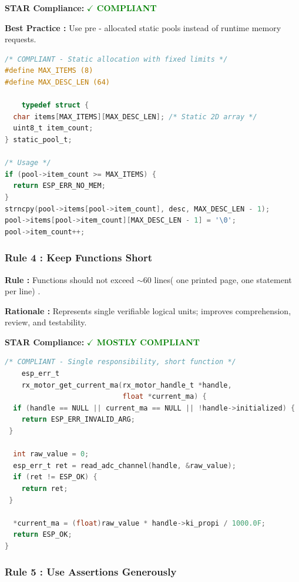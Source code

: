 \textbf{STAR Compliance:
}
\textcolor{green} {
  \textbf{$\checkmark$ COMPLIANT}
}

\textbf{Best Practice :} Use pre -
    allocated static pools instead of runtime memory requests.

\begin{lstlisting}[language = C]
/* COMPLIANT - Static allocation with fixed limits */
#define MAX_ITEMS (8)
#define MAX_DESC_LEN (64)

    typedef struct {
  char items[MAX_ITEMS][MAX_DESC_LEN]; /* Static 2D array */
  uint8_t item_count;
} static_pool_t;

/* Usage */
if (pool->item_count >= MAX_ITEMS) {
  return ESP_ERR_NO_MEM;
}
strncpy(pool->items[pool->item_count], desc, MAX_DESC_LEN - 1);
pool->items[pool->item_count][MAX_DESC_LEN - 1] = '\0';
pool->item_count++;
\end{lstlisting}

\subsubsection{Rule 4 : Keep Functions Short}

\textbf{Rule :} Functions should not exceed $\sim$60 lines(
    one printed page, one statement per line)
    .

\textbf{Rationale :} Represents single verifiable logical units;
improves comprehension, review,
    and testability.

\textbf{STAR Compliance:
}
\textcolor{green} {
  \textbf{$\checkmark$ MOSTLY COMPLIANT}
}

\begin{lstlisting}[language = C]
    /* COMPLIANT - Single responsibility, short function */
    esp_err_t
    rx_motor_get_current_ma(rx_motor_handle_t *handle,
                            float *current_ma) {
  if (handle == NULL || current_ma == NULL || !handle->initialized) {
    return ESP_ERR_INVALID_ARG;
 }

  int raw_value = 0;
  esp_err_t ret = read_adc_channel(handle, &raw_value);
  if (ret != ESP_OK) {
    return ret;
 }

  *current_ma = (float)raw_value * handle->ki_propi / 1000.0F;
  return ESP_OK;
}
\end{lstlisting}

\subsubsection{Rule 5 : Use Assertions Generously}

